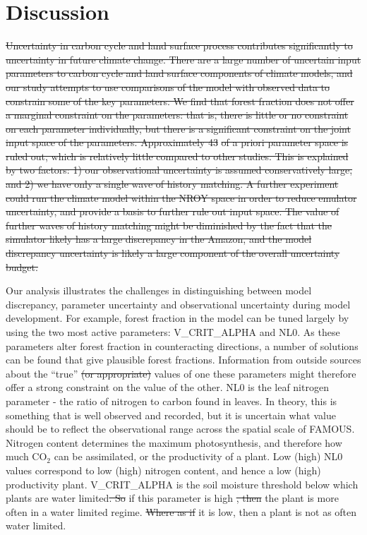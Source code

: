 \documentclass[esd, article]{copernicus} %
\providecommand{\DIFadd}[1]{{\protect\color{blue}\uwave{#1}}} %
\providecommand{\DIFdel}[1]{{\protect\color{red}\sout{#1}}}                      %
\providecommand{\DIFaddbegin}{} %
\providecommand{\DIFaddend}{} %
\providecommand{\DIFdelbegin}{} %
\providecommand{\DIFdelend}{} %
\begin{document}

\section{Discussion}\label{sec:discussion}
\DIFdelbegin \DIFdel{Uncertainty in carbon cycle and land surface process contributes significantly to uncertainty in future climate change. There are a large number of uncertain input parameters to carbon cycle and land surface components of climate models, and our study attempts to use comparisons of the model with observed data to constrain some of the key parameters. We find that forest fraction does not offer a marginal constraint on the parameters: that is, there is little or no constraint on each parameter individually, but there is a significant constraint on the joint input space of the parameters. Approximately 43}%
\DIFdel{of a priori parameter space is ruled out, which is relatively little compared to other studies. This is explained by two factors: 1) our observational uncertainty is assumed conservatively large, and 2) we have only a single wave of history matching. A further experiment could run the climate model within the NROY space in order to reduce emulator uncertainty, and provide a basis to further rule out input space. The value of further waves of history matching might be diminished by the fact that the simulator likely has a large discrepancy in the Amazon, and the model discrepancy uncertainty is likely a large component of the overall uncertainty budget.
}%

\DIFdelend Our analysis illustrates the challenges in distinguishing between model discrepancy, parameter uncertainty and observational uncertainty during model development. For example, forest fraction in the model can be tuned largely by using the two most active parameters: V\_CRIT\_ALPHA and NL0.  As these parameters alter forest fraction in counteracting directions, a number of solutions can be found that give plausible forest fractions. Information from outside sources about the ``true'' \DIFdelbegin \DIFdel{(or appropriate) }\DIFdelend values of one these parameters might therefore offer a strong constraint on the value of the other. NL0 is the leaf nitrogen parameter - the ratio of nitrogen to carbon found in leaves. In theory, this is something that is well observed and recorded, but it is uncertain what value should be to reflect the observational range across the spatial scale of FAMOUS. Nitrogen content determines the maximum photosynthesis, and therefore how much CO$_2$ can be assimilated, or the productivity of a plant. Low (high) NL0 values correspond to low (high) nitrogen content, and hence a low (high) productivity plant. V\_CRIT\_ALPHA is the soil moisture threshold below which plants are water limited\DIFdelbegin \DIFdel{.  So }\DIFdelend \DIFaddbegin \DIFadd{, so }\DIFaddend if this parameter is high \DIFdelbegin \DIFdel{, then }\DIFdelend the plant is more often in a water limited regime. \DIFdelbegin \DIFdel{Where as if }\DIFdelend \DIFaddbegin \DIFadd{If }\DIFaddend it is low, then a plant is not as often water limited.
\end{document}
